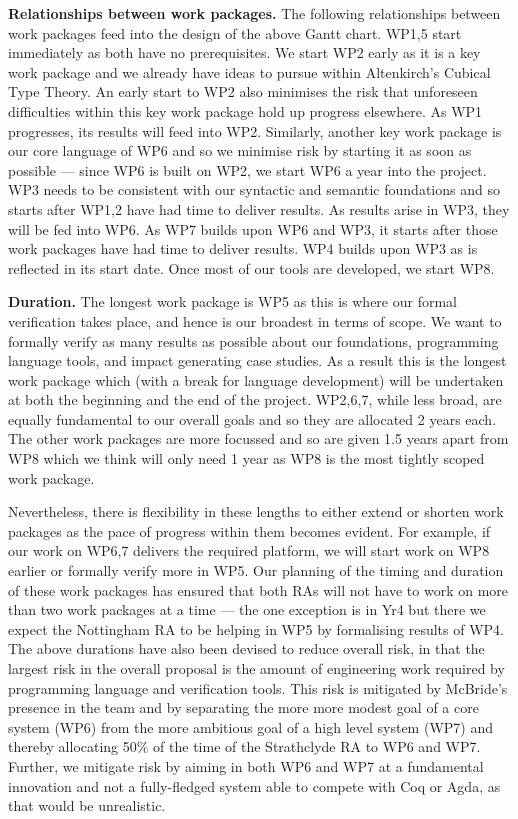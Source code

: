\documentclass[a4paper,11pt]{article}
\begin{document}
\bigskip

{\bf Relationships between work packages.} The following 
relationships between work packages feed into the design of the above
Gantt chart. WP1,5 start immediately as both have no prerequisites. We
start WP2 early as it is a key work package and we already have
ideas to pursue within Altenkirch's Cubical Type Theory. An early
start to WP2 also minimises the risk that unforeseen difficulties
within this key work package hold up progress elsewhere. As WP1
progresses, its results will feed into WP2. Similarly, another key
work package is our core language of WP6 and so we minimise risk by
starting it as soon as possible --- since WP6 is built on WP2, we
start WP6 a year into the project. WP3 needs to be consistent with our
syntactic and semantic foundations and so starts after WP1,2 have had
time to deliver results. As results arise in WP3, they will be fed
into WP6. As WP7 builds upon WP6 and WP3, it starts after those work
packages have had time to deliver results. WP4 builds upon WP3 as is
reflected in its start date. Once most of our tools are
developed, we start WP8.

{\bf Duration.} The longest work package is WP5 as this is where our
formal verification takes place, and hence is our broadest in terms of
scope. We want to formally verify as many results as possible about
our foundations, programming language tools, and impact generating
case studies.  As a result this is the longest work package which
(with a break for language development) will be undertaken at both the
beginning and the end of the project. WP2,6,7, while less broad, are
equally fundamental to our overall goals and so they are allocated 2
years each. The other work packages are more focussed and
so are given 1.5 years apart from WP8 which we think will only need 1
year as WP8 is the most tightly scoped work package.

Nevertheless, there is flexibility in these lengths to either extend
or shorten work packages as the pace of progress within them becomes
evident. For example, if our work on WP6,7 delivers the required
platform, we will start work on WP8 earlier or formally verify more in
WP5.  Our planning of the timing and duration of these work packages
has ensured that both RAs will not have to work on more than two work
packages at a time --- the one exception is in Yr4 but
there we expect the Nottingham RA to be helping in WP5 by formalising
results of WP4. The above durations have also been
devised to reduce overall risk, in that the largest risk in the
overall proposal is the amount of engineering work required by
programming language and verification tools. This risk is mitigated by
McBride's presence in the team and by separating the
more more modest goal of a core system (WP6) from the more ambitious
goal of a high level system (WP7) and thereby allocating 50$\%$ of the
time of the Strathclyde RA to WP6 and WP7. Further, we mitigate risk 
by aiming in both WP6 and WP7 at a fundamental innovation and not a
fully-fledged system able to compete with Coq or Agda, as that would
be unrealistic.
\end{document}
